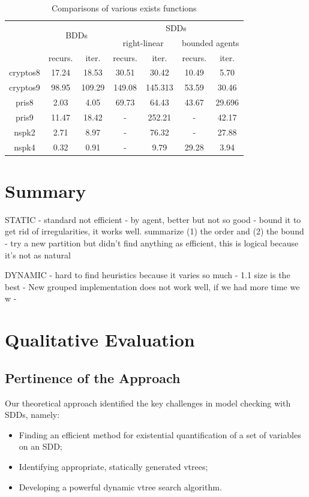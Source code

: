 \documentclass[11pt]{report}
\begin{document}
\begin{table}
\centering
\begin{tabular}{|*{7}{c|}}
\hline
 &\multicolumn{2}{c|}{\multirow{2}{*}{BDDs}} & \multicolumn{4}{c|}{SDDs}  \\ \cline{4-7}
 & \multicolumn{2}{c|}{}& \multicolumn{2}{c|}{right-linear}& \multicolumn{2}{c|}{bounded agents}\\ \hline
 & recurs. & iter. & recurs. & iter. & recurs. & iter. \\ \hline 
cryptos8 &17.24 & 18.53 & 30.51 & 30.42 & 10.49 & 5.70\\ \hline
cryptos9 & 98.95  & 109.29 & 149.08 & 145.313 & 53.59 & 30.46\\ \hline
pris8 & 2.03 & 4.05  & 69.73&64.43  &43.67 & 29.696 \\ \hline
pris9 & 11.47& 18.42 & - & 252.21 & -& 42.17 \\ \hline
nspk2 & 2.71 & 8.97 & - & 76.32 & -& 27.88\\ \hline
nspk4 & 0.32 & 0.91 & - & 9.79 & 29.28 & 3.94 \\ \hline
\end{tabular}
\caption{Comparisons of various exists functions}
\label{table:existcomparisons}
\end{table}

\section{Summary}

STATIC 
- standard not efficient
- by agent, better but not so good
- bound it to get rid of irregularities, it works well. summarize (1) the order and (2) the bound
- try a new partition but didn't find anything as efficient, this is logical because it's not as natural

DYNAMIC 
- hard to find heuristics because it varies so much
- 1.1 size is the best
- New grouped implementation does not work well, if we had more time we w
-

\section{Qualitative Evaluation}

\subsection{Pertinence of the Approach}

Our theoretical approach identified the key challenges in model checking with SDDs, namely:
\begin{itemize}
\item Finding an efficient method for existential quantification of a set of variables on an SDD;
\item Identifying appropriate, statically generated vtrees;
\item Developing a powerful dynamic vtree search algorithm.
\end{itemize}
\end{document}
